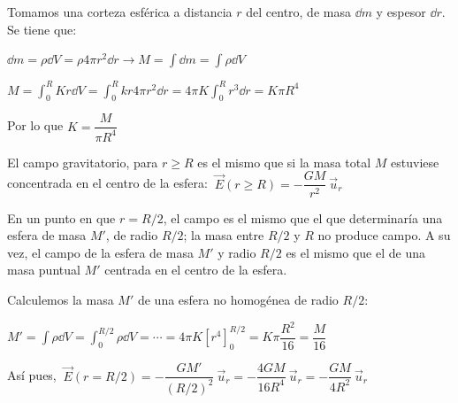 Tomamos una corteza esférica a distancia $r$ del centro, de masa $\dd m$ y espesor $\dd r$. Se tiene que:

$\displaystyle \dd m=\rho \dd V= \rho 4\pi r^2 \dd r \to M=\int \dd m =\int \rho \dd V$

$\displaystyle M=\int_0^R Kr \dd V = \int_0^R k r 4\pi r^2 \dd r= 4\pi K \int_0^R r^3 \dd r= K\pi R^4$

Por lo que $K=\dfrac{M}{\pi R^4}$

El campo gravitatorio, para $r\geq R$ es el mismo que si la masa total $M$ estuviese concentrada en el centro de la esfera:
$\ \vec E(r\geq R)=-\dfrac{GM}{r^2}\ \vec u_r$

En un punto en que $r=R/2$, el campo es el mismo que el que determinaría una esfera de masa $M'$, de radio $R/2$; la masa entre $R/2$ y $R$ no produce campo. A su vez, el campo de la esfera de masa $M'$ y radio $R/2$ es el mismo que el de una masa puntual $M'$ centrada en el centro de la esfera.

Calculemos la masa $M'$ de una esfera no homogénea de radio $R/2$:

$M'=\displaystyle \int \rho \dd V=\int_0^{R/2}\rho \dd V = \cdots = 4\pi K  \left[ r^4 \right]_0^{R/2}= K\pi \dfrac {R^2}{16} =\dfrac{M}{16}$

Así pues, $\ \vec E(r=R/2)= -\dfrac{GM'}{(R/2)^2}\ \vec u_r=-\dfrac{4GM}{16R^4} \ \vec u_r =-\dfrac{GM}{4R^2}\ \vec u_r$




